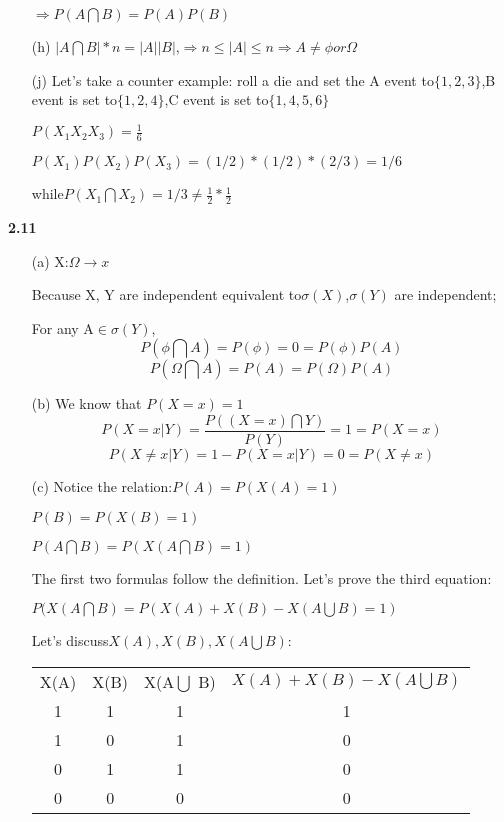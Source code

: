 \begin{enumerate}
$\Rightarrow P(A \bigcap B)=P(A)P(B)$

\item[(h)]$|A\bigcap B|*n = |A||B|$,$\Rightarrow n\leq |A|\leq n \Rightarrow A\neq\phi or \Omega$

\item[(j)]Let's take a counter example: roll a die and set the A event to$\{1,2,3\}$,B event is set to$\{1,2,4\}$,C event is set to$\{1,4,5,6\}$

$P(X_1 X_2 X_3)=\frac{1}{6}$

$P(X_1)P(X_2)P(X_3)=(1/2)*(1/2)*(2/3)=1/6$

while$P(X_1\bigcap X_2)=1/3\neq \frac{1}{2}*\frac{1}{2}$
\end{enumerate}

\noindent\textbf{2.11}

\begin{enumerate}
    \item[(a)]X:$\Omega\rightarrow x$

Because X, Y are independent equivalent to$\sigma(X)$,$\sigma(Y)$ are independent;

For any A$\in \sigma(Y)$,
$$P(\phi \bigcap A)=P(\phi)=0=P(\phi)P(A)$$
$$P(\Omega \bigcap A)=P(A)=P(\Omega)P(A)$$

\item[(b)]We know that $P(X=x)=1$
$$P(X=x|Y)=\frac{P((X=x)\bigcap Y)}{P(Y)}=1=P(X=x)$$
$$P(X\neq x|Y)=1-P(X=x|Y)=0=P(X\neq x)$$

\item[(c)]Notice the relation:$P(A)=P(X(A)=1)$

$P(B)=P(X(B)=1)$

$P(A\bigcap B)=P(X(A\bigcap B)=1)$

The first two formulas follow the definition. Let's prove the third equation:

$P(X(A\bigcap B)=P(X(A)+X(B)-X(A\bigcup B) = 1)$

Let's discuss$X(A),X(B),X(A\bigcup B)$:

\begin{tabular}{|c|c|c|c|}
  \hline
  X(A) & X(B) & X(A$\bigcup$ B) & $X(A)+X(B)-X(A\bigcup B)$ \\
  1 & 1 & 1 & 1 \\
  1 & 0 & 1 & 0 \\
  0 & 1 & 1 & 0 \\
  0 & 0 & 0 & 0 \\
  \hline
\end{tabular}


\end{enumerate}
